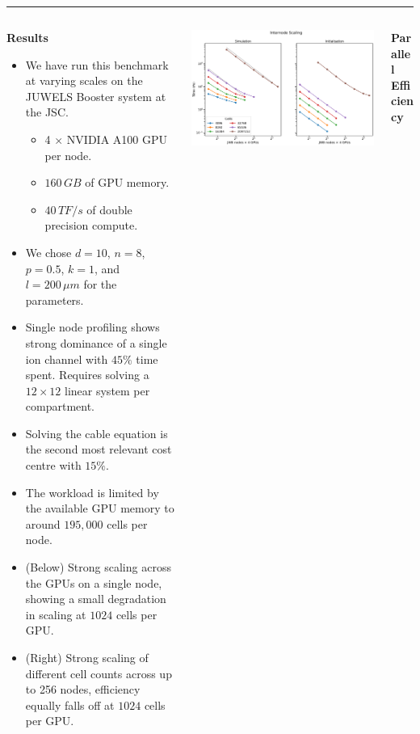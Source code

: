 \documentclass{beamer}
\begin{document}
\begin{frame}[t, fragile]
  \vspace*{1ex}
  \textcolor{arborange}{\rule{\textwidth}{0.5ex}}
  \vspace*{-1ex}
  \begin{columns}[t]
    \begin{column}[T]{0.25\textwidth}
      \textbf{Results}
      \begin{itemize}
        \item We have run this benchmark at varying scales on the JUWELS Booster
        system at the JSC.
        \begin{itemize}
          \item 4 $\times$ NVIDIA A100 GPU per node.
          \item $160\,GB$ of GPU memory.
          \item $40\, TF/s$ of double precision compute.
        \end{itemize}
        \item We chose $d=10$, $n=8$, $p=0.5$, $k=1$, and $l=200\,\mu m$ for the
              parameters.
        \item Single node profiling shows strong dominance of a single ion
              channel with $45\%$ time spent. Requires solving a
              $12\times 12$ linear system per compartment.
        \item Solving the cable equation is the second most relevant cost centre with $15\%$.
        \item The workload is limited by the available GPU memory to around
              $195,000$ cells per node.
        \item (Below) Strong scaling across the GPUs on a single node, showing a
              small degradation in scaling at $1024$ cells per GPU.
        \item (Right) Strong scaling of different cell counts across up to 256
              nodes, efficiency equally falls off at $1024$ cells per GPU.
      \end{itemize}
    \end{column}
    \begin{column}[T]{0.45\textwidth}
      \includegraphics[width=\textwidth]{internode}
    \end{column}
    \begin{column}[T]{0.25\textwidth}
      \textbf{Parallel Efficiency}


\end{column}
\end{columns}
\end{frame}
\end{document}

